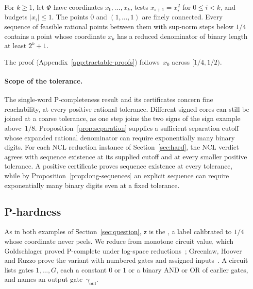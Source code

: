 \begin{proposition}\label{prop:long-sequences}
For $k\ge1$, let $\Phi$ have coordinates $x_0,\dots,x_k$, tests
$x_{i+1}=x_i^2$ for $0\le i<k$, and budgets $|x_i|\le1$. The points $0$
and $(1,\dots,1)$ are finely connected. Every sequence of feasible rational
points between them with sup-norm steps below $1/4$ contains a point whose
coordinate $x_k$ has a reduced denominator of binary length at least
$2^k+1$.
\end{proposition}

The proof (Appendix~\ref{app:tractable-proofs}) follows~$x_0$ across
$[1/4,1/2)$.

\paragraph{Scope of the tolerance.} The single-word P-completeness result
and its certificates concern fine reachability, at every positive rational
tolerance. Different signed cores can still be joined at a coarse
tolerance, as one step joins the two signs of the sign example above~$1/8$. Proposition~\ref{prop:separation} supplies a
sufficient separation cutoff whose expanded rational denominator can
require exponentially many binary digits. For each NCL reduction instance
of Section~\ref{sec:hard}, the NCL verdict agrees with sequence existence
at its supplied cutoff and at every smaller positive tolerance. A positive
certificate proves sequence existence at every tolerance, while by
Proposition~\ref{prop:long-sequences} an explicit sequence can require
exponentially many binary digits even at a fixed tolerance.

\subsection{P-hardness}\label{sec:p-hardness}

As in both examples of Section~\ref{sec:question}, $\mathsf z$ is the
, a label calibrated to $1/4$ whose coordinate never peels.
We reduce from monotone circuit value, which Goldschlager proved P-complete
under log-space reductions~\cite{goldschlager}; Greenlaw, Hoover and Ruzzo
prove the variant with numbered gates and assigned
inputs~\cite[Theorem~6.2.2]{greenlawhooverruzzo}. A circuit lists gates
$1,\dots,G$, each a constant $0$ or $1$ or a binary AND or OR of earlier
gates, and names an output gate~$\gamma_{\mathrm{out}}$.

